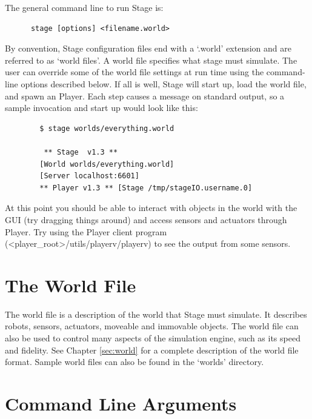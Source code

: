 \documentclass[11pt,twoside]{report}
\begin{document}
    The general command line to run Stage is: 
      \begin{verbatim} 
      stage [options] <filename.world> 
      \end{verbatim} 

    By convention, Stage configuration files end with a `.world'
    extension and are referred to as `world files'. A world file
    specifies what stage must simulate. The user can override some of
    the world file settings at run time using the command-line options
    described below. If all is well, Stage will start up, load the
    world file, and spawn an Player. Each step causes a message on
    standard output, so a sample invocation and start up would look
    like this:

        \begin{verbatim} 
        $ stage worlds/everything.world

         ** Stage  v1.3 ** 
        [World worlds/everything.world]
        [Server localhost:6601]
        ** Player v1.3 ** [Stage /tmp/stageIO.username.0]
      \end{verbatim}

    At this point you should be able to interact with objects in the
    world with the GUI (try dragging things around) and access sensors
    and actuators through Player. Try using the Player client program
    (<player\_root>/utils/playerv/playerv) to see the output from some
    sensors.

  
  \section{The World File}

    The world file is a description of the world that Stage must
    simulate.  It describes robots, sensors, actuators, moveable and
    immovable objects.  The world file can also be used to control
    many aspects of the simulation engine, such as its speed and
    fidelity.  See Chapter \ref{sec:world} for a complete description
    of the world file format.  Sample world files can also be found in
    the `worlds' directory.

  \section{Command Line Arguments}
\end{document}
